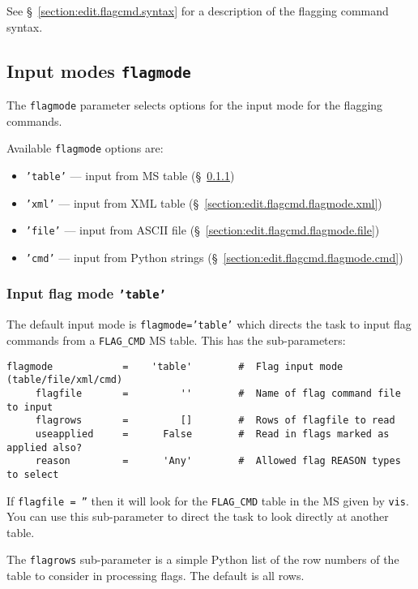 See \S~\ref{section:edit.flagcmd.syntax} for a description of the
flagging command syntax.

\subsection{Input modes {\tt flagmode}}
\label{section:edit.flagcmd.flagmode}

The {\tt flagmode} parameter selects options for the input mode for
the flagging commands.

Available {\tt flagmode} options are:
\begin{itemize}
   \item {\tt 'table'} --- input from MS table (\S~\ref{section:edit.flagcmd.flagmode.table})
   \item {\tt 'xml'} --- input from XML table (\S~\ref{section:edit.flagcmd.flagmode.xml})
   \item {\tt 'file'} --- input from ASCII file (\S~\ref{section:edit.flagcmd.flagmode.file})
   \item {\tt 'cmd'} --- input from Python strings (\S~\ref{section:edit.flagcmd.flagmode.cmd})
\end{itemize}

\subsubsection{Input flag mode {\tt 'table'}}
\label{section:edit.flagcmd.flagmode.table}

The default input mode is {\tt flagmode='table'} which directs the
task to input flag commands from a {\tt FLAG\_CMD} MS table.  
This has the sub-parameters:
\small
\begin{verbatim}
flagmode            =    'table'        #  Flag input mode (table/file/xml/cmd)
     flagfile       =         ''        #  Name of flag command file to input
     flagrows       =         []        #  Rows of flagfile to read
     useapplied     =      False        #  Read in flags marked as applied also?
     reason         =      'Any'        #  Allowed flag REASON types to select
\end{verbatim}
\normalsize
If {\tt flagfile = ''} then it will look for the {\tt FLAG\_CMD} 
table in the MS given by {\tt vis}.  You can use this sub-parameter to
direct the task to look directly at another table.

The {\tt flagrows} sub-parameter is a simple Python list of the row
numbers of the table to consider in processing flags.  The default is
all rows.

